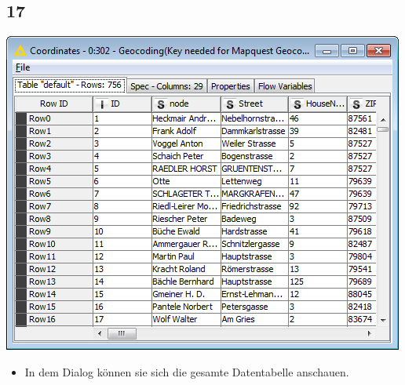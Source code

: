 \documentclass{beamer}
\begin{document}
\subsection{17}
\begin{frame}
	\begin{center}
  		\includegraphics[height=0.6\textheight]{17.png}
	\end{center}
	\begin{itemize}
		\item In dem Dialog können sie sich die gesamte Datentabelle anschauen.
	\end{itemize}
\end{frame}
\end{document}
